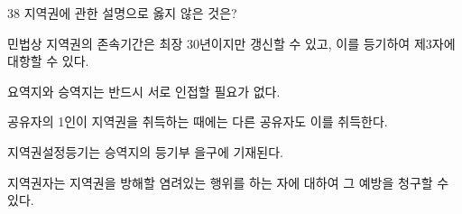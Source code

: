 \begin{question}{38}
지역권에 관한 설명으로 옳지 않은 것은?
\begin{choices}
  \item 민법상 지역권의 존속기간은 최장 30년이지만 갱신할 수 있고, 이를 등기하여 제3자에 대항할 수 있다.
  \item 요역지와 승역지는 반드시 서로 인접할 필요가 없다.
  \item 공유자의 1인이 지역권을 취득하는 때에는 다른 공유자도 이를 취득한다.
  \item 지역권설정등기는 승역지의 등기부 을구에 기재된다.
  \item 지역권자는 지역권을 방해할 염려있는 행위를 하는 자에 대하여 그 예방을 청구할 수 있다.
\end{choices}
\end{question}
